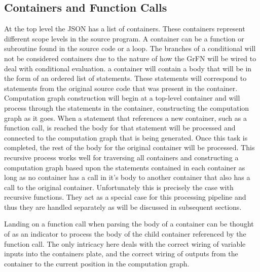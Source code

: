 \subsection{Containers and Function Calls\label{sec:containers}}
At the top level the JSON has a list of containers. These containers represent different scope levels in the source program. A container can be a function or subroutine found in the source code or a loop. The branches of a conditional will not be considered containers due to the nature of how the GrFN will be wired to deal with conditional evaluation. a container will contain a body that will be in the form of an ordered list of statements. These statements will correspond to statements from the original source code that was present in the container. Computation graph construction will begin at a top-level container and will process through the statements in the container, constructing the computation graph as it goes. When a statement that references a new container, such as a function call, is reached the body for that statement will be processed and connected to the computation graph that is being generated. Once this task is completed, the rest of the body for the original container will be processed. This recursive process works well for traversing all containers and constructing a computation graph based upon the statements contained in each container as long as no container has a call in it's body to another container that also has a call to the original container. Unfortunately this is precisely the case with recursive functions. They act as a special case for this processing pipeline and thus they are handled separately as will be discussed in subsequent sections.

Landing on a function call when parsing the body of a container can be thought of as an indicator to process the body of the child container referenced by the function call. The only intricacy here deals with the correct wiring of variable inputs into the containers plate, and the correct wiring of outputs from the container to the current position in the computation graph.


